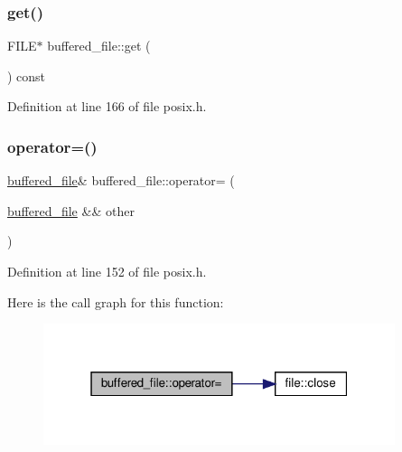 \mbox{\label{classbuffered__file_accd1dfb78afe54625f990b03f56f8435}} 
\subsubsection{\texorpdfstring{get()}{get()}}
{\footnotesize\ttfamily F\+I\+LE$\ast$ buffered\+\_\+file\+::get (\begin{DoxyParamCaption}{ }\end{DoxyParamCaption}) const\hspace{0.3cm}{\ttfamily [inline]}}



Definition at line 166 of file posix.\+h.

\mbox{\label{classbuffered__file_a158ef2fb37854e3c6799dd40a72fa56b}} 
\subsubsection{\texorpdfstring{operator=()}{operator=()}}
{\footnotesize\ttfamily \hyperlink{classbuffered__file}{buffered\+\_\+file}\& buffered\+\_\+file\+::operator= (\begin{DoxyParamCaption}\item[{\hyperlink{classbuffered__file}{buffered\+\_\+file} \&\&}]{other }\end{DoxyParamCaption})\hspace{0.3cm}{\ttfamily [inline]}}



Definition at line 152 of file posix.\+h.

Here is the call graph for this function\+:
\nopagebreak
\begin{figure}[H]
\begin{center}
\leavevmode
\includegraphics[width=292pt]{classbuffered__file_a158ef2fb37854e3c6799dd40a72fa56b_cgraph}
\end{center}
\end{figure}
\mbox{\label{classbuffered__file_ad97c4521f94be51a5b30064803e2bef1}} 

